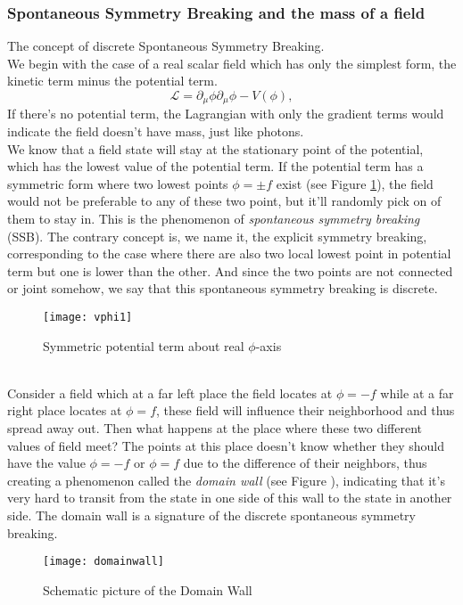\documentclass{article}
\newcommand{\be}{\begin{equation}}
\newcommand{\ee}{\end{equation}}
\newcommand{\p}{\partial}
\renewcommand{\1}{\left}
\renewcommand{\2}{\right}
\newcommand{\ma}{\mathcal}
\newcommand{\m}{\mu}
\begin{document}
\subsubsection{Spontaneous Symmetry Breaking and the mass of a field}
The concept of discrete Spontaneous Symmetry Breaking.\\
We begin with the case of a real scalar field which has only the simplest form, the kinetic term minus the potential term.
\be
\ma L=\p_\m \phi\p_\m \phi-V(\phi),
\ee
If there's no potential term, the Lagrangian with only the gradient terms would indicate the field doesn't have mass, just like photons.\\ %
We know that a field state will stay at the stationary point of the potential, which has the lowest value of the potential term. If the potential term has a symmetric form where two lowest points $\phi=\pm f$ exist (see Figure \ref{vphi1}), the field would not be preferable to any of these two point, but it'll randomly pick on of them to stay in. This is the phenomenon of \textit{spontaneous symmetry breaking} (SSB). The contrary concept is, we name it, the explicit symmetry breaking, corresponding to the case where there are also two local lowest point in potential term but one is lower than the other. And since the two points are not connected or joint somehow, we say that this spontaneous symmetry breaking is discrete.
\begin{figure}[h]
\centering
\texttt{[image: vphi1]}
\caption{\label{vphi1}Symmetric potential term about real $\phi$-axis}
\end{figure}\\

Consider a field which at a far left place the field locates at $\phi=-f$ while at a far right place locates at $\phi=f$, these field will influence their neighborhood and thus spread away out. Then what happens at the place where these two different values of field meet? The points at this place doesn't know whether they should have the value $\phi=-f$ or $\phi=f$ due to the difference of their neighbors, thus creating a phenomenon called the \textit{domain wall} (see Figure \label{dw}), indicating that it's very hard to transit from the state in one side of this wall to the state in another side. The domain wall is a signature of the discrete spontaneous symmetry breaking.
\begin{figure}[h]
\centering
\texttt{[image: domainwall]}
\caption{\label{dw}Schematic picture of the Domain Wall}
\end{figure}\\
\end{document}
